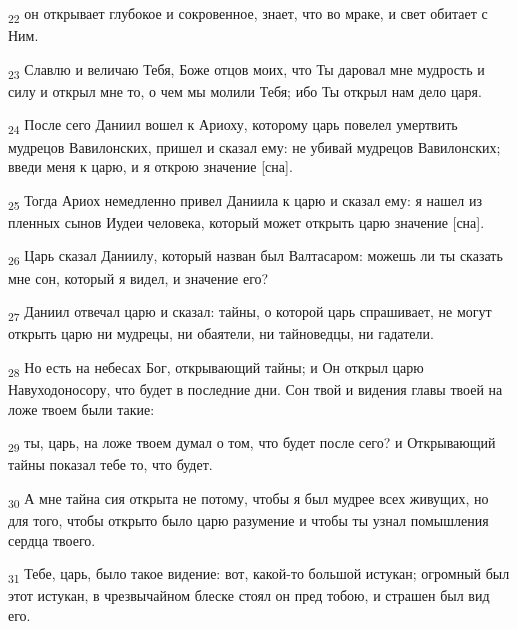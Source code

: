\begin{tcolorbox}
\textsubscript{22} он открывает глубокое и сокровенное, знает, что во мраке, и свет обитает с Ним.
\end{tcolorbox}
\begin{tcolorbox}
\textsubscript{23} Славлю и величаю Тебя, Боже отцов моих, что Ты даровал мне мудрость и силу и открыл мне то, о чем мы молили Тебя; ибо Ты открыл нам дело царя.
\end{tcolorbox}
\begin{tcolorbox}
\textsubscript{24} После сего Даниил вошел к Ариоху, которому царь повелел умертвить мудрецов Вавилонских, пришел и сказал ему: не убивай мудрецов Вавилонских; введи меня к царю, и я открою значение [сна].
\end{tcolorbox}
\begin{tcolorbox}
\textsubscript{25} Тогда Ариох немедленно привел Даниила к царю и сказал ему: я нашел из пленных сынов Иудеи человека, который может открыть царю значение [сна].
\end{tcolorbox}
\begin{tcolorbox}
\textsubscript{26} Царь сказал Даниилу, который назван был Валтасаром: можешь ли ты сказать мне сон, который я видел, и значение его?
\end{tcolorbox}
\begin{tcolorbox}
\textsubscript{27} Даниил отвечал царю и сказал: тайны, о которой царь спрашивает, не могут открыть царю ни мудрецы, ни обаятели, ни тайноведцы, ни гадатели.
\end{tcolorbox}
\begin{tcolorbox}
\textsubscript{28} Но есть на небесах Бог, открывающий тайны; и Он открыл царю Навуходоносору, что будет в последние дни. Сон твой и видения главы твоей на ложе твоем были такие:
\end{tcolorbox}
\begin{tcolorbox}
\textsubscript{29} ты, царь, на ложе твоем думал о том, что будет после сего? и Открывающий тайны показал тебе то, что будет.
\end{tcolorbox}
\begin{tcolorbox}
\textsubscript{30} А мне тайна сия открыта не потому, чтобы я был мудрее всех живущих, но для того, чтобы открыто было царю разумение и чтобы ты узнал помышления сердца твоего.
\end{tcolorbox}
\begin{tcolorbox}
\textsubscript{31} Тебе, царь, было такое видение: вот, какой-то большой истукан; огромный был этот истукан, в чрезвычайном блеске стоял он пред тобою, и страшен был вид его.
\end{tcolorbox}
